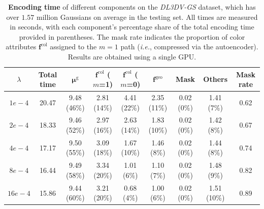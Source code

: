 \documentclass{article} %
\newcommand{\ie}{\textit{i.e.}}
\begin{document}
\begin{table}[H]
    \small
    \centering
    \caption{\textbf{Encoding time} of different components on the \textit{DL3DV-GS} dataset, which has over $1.57$ million Gaussians on average in the testing set. All times are measured in seconds, with each component’s percentage share of the total encoding time provided in parentheses. The mask rate indicates the proportion of color attributes $\bm{f}^{\text{col}}$ assigned to the $m=1$ path (\ie, compressed via the autoencoder). Results are obtained using a single GPU.}
    \vspace{5pt}
    \renewcommand{\arraystretch}{1.20}
    \begin{tabular}{c|c|cccccc|c}
        \toprule[2pt]
        $\lambda$   & Total time   & $\bm{\mu}^\text{g}$ & $\bm{f}^{\text{col}}$ ($m$=1) & $\bm{f}^{\text{col}}$ ($m$=0) & $\bm{f}^{\text{geo}}$ & Mask & Others & Mask rate  \\ \toprule
        $1e-4$ & 20.47 & 9.48 (46\%) & 2.81 (14\%) & 4.41 (22\%) & 2.35 (11\%) & 0.02 (0\%) & 1.41 (7\%) & 0.62     \\
        $2e-4$ & 18.33 & 9.46 (52\%) & 2.97 (16\%) & 2.63 (14\%) & 1.83 (10\%) & 0.02 (0\%) & 1.42 (8\%) & 0.67    \\
        $4e-4$ & 17.17 & 9.50 (55\%) & 3.09 (18\%) & 1.67 (10\%) & 1.46 (8\%) & 0.02 (0\%) & 1.44 (8\%) & 0.74    \\
        $8e-4$ & 16.44 & 9.49 (58\%) & 3.34 (20\%) & 1.01 (6\%) & 1.10 (7\%) & 0.02 (0\%) & 1.48 (9\%) & 0.82    \\
        $16e-4$ & 15.86 & 9.44 (60\%) & 3.21 (20\%) & 0.68 (4\%) & 1.00 (6\%) & 0.02 (0\%) & 1.51 (10\%) & 0.89    \\ \bottomrule[2pt]
    \end{tabular}
\end{table}
\end{document}
